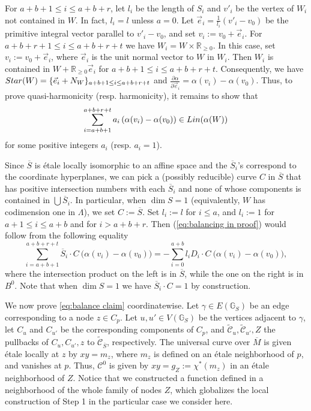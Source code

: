 \documentclass[11pt,reqno]{amsart}
\numberwithin{equation}{section}
\theoremstyle{definition}
\newcommand{\Lin}{{\rm Lin}}
\newcommand{\RR}{{\mathbb R}}
\newcommand{\GG}{{\mathbb G}}
\newcommand{\Star}{{\rm Star}}
\newcommand{\cC}{{\mathcal{C}}}
\theoremstyle{remark}
\begin{document}
For $a+b+1\leq i\leq a+b+r$,
let $l_i$ be the length of $S_i$ and  $v'_i$ be the vertex of $W_i$ not contained in $W$. In fact, $l_i=l$ unless $a=0$. Let $\vec e_i=\frac{1}{l_i}(v'_i-v_0)$ be the primitive integral vector parallel to $v'_i-v_0$, and set $v_i:=v_0+\vec e_i$. For $a+b+r+1\leq i\leq a+b+r+t$ we have $W_i=W\times \RR_{\geq 0}$. In this case, set $v_i:=v_0+\vec e_i$, where $\vec e_i$ is the unit normal vector to $W$ in $W_i$. Then $W_i$ is contained in $W+\RR_{\geq 0}\vec e_i$ for $a+b+1\leq i\leq a+b+r+t$. Consequently, we have $\Star(W)=\{\vec e_i+N_W\}_{a+b+1\leq i\leq a+b+r+t}$ and $\frac{\partial \alpha}{\partial\vec e_i}=\alpha(v_i)-\alpha(v_0)$. Thus, to prove quasi-harmonicity (resp. harmonicity), it remains to show that
\begin{equation}\label{eq:balancing in proof}
   \sum_{i=a+b+1}^{a+b+r+t}a_i\left(\alpha(v_i)-\alpha(v_0)\right)\in\Lin(\alpha(W))
\end{equation}
for some positive integers $a_i$ (resp. $a_i=1$).

Since $\overline S$ is \'etale locally isomorphic to an affine space and the $\overline S_i$'s correspond to the coordinate hyperplanes, we can pick a (possibly reducible) curve $C$ in $\overline S$ that has positive intersection numbers with each $\overline S_i$ and none of whose components is contained in $\bigcup \overline{S}_i$.  In particular, when $\dim S=1$ (equivalently, $W$ has codimension one in $\Lambda$), we set $C:=\overline S$. Set $l_i:=l$ for $i\le a$, and $l_i:=1$ for $a+1\le i\le a+b$ and for $i>a+b+r$. Then (\ref{eq:balancing in proof}) would follow from the following equality
\begin{equation}\label{eq:balance claim}
\sum_{i=a+b+1}^{a+b+r+t}\overline S_i\cdot C \ \big(\alpha(v_i)-\alpha(v_0)\big)=-\sum_{i=0}^{a+b}l_iD_i\cdot C\  \big(\alpha(v_i)-\alpha(v_0)\big),
\end{equation} 
where the intersection product on the left is in $\overline S$, while the one on the right is in $B^0$. Note that when $\dim S=1$ we have $\overline S_i\cdot C=1$ by construction.

We now prove \eqref{eq:balance claim} coordinatewise. Let $\gamma\in E(\GG_{S})$ be an edge corresponding to a node $z\in C_p$.   
Let $u,u'\in V(\GG_S)$ be the vertices adjacent to $\gamma$, let $C_u$ and $C_{u'}$ be the corresponding components of $C_p$, and $\widetilde{\cC}_u, \widetilde{\cC}_{u'}, Z$ the pullbacks of $C_u, C_{u'}, z$ to $\widetilde{\cC}_{\overline S}$, respectively. The universal curve over $\overline M$ is given \'etale locally at $z$ by $xy=m_z$, where $m_z$ is defined on an \'etale neighborhood of $p$, and vanishes at $p$. Thus, $\cC^0$ is given by $xy=g_Z:=\chi^*(m_z)$ in an \'etale neighborhood of $Z$. Notice that we constructed a function defined in a neighborhood of the whole family of nodes $Z$, which globalizes the local construction of Step 1 in the particular case we consider here. 
\end{document}
